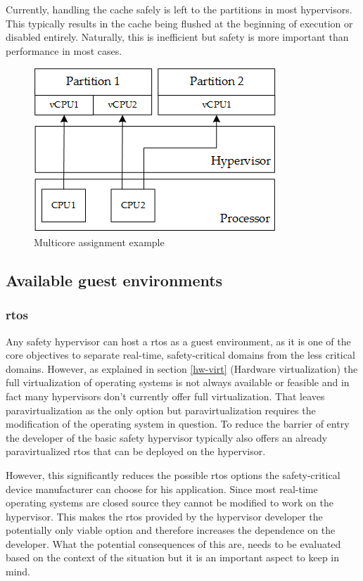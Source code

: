 Currently, handling the cache safely is left to the partitions in most hypervisors. This typically results in the cache being flushed at the beginning of execution or disabled entirely. Naturally, this is inefficient but safety is more important than performance in most cases.

\begin{figure}[hb!]
\centering
\includegraphics[scale=0.75]{Figures/multicore.png}
\decoRule
\caption{Multicore assignment example}
\label{fig:multicore}
\end{figure}

\subsection{Available guest environments}
\subsubsection{\acrshort{rtos}}
Any safety hypervisor can host a \acrlong{rtos} as a guest environment, as it is one of the core objectives to separate real-time, safety-critical domains from the less critical domains. However, as explained in section \ref{hw-virt} (Hardware virtualization) the full virtualization of operating systems is not always available or feasible and in fact many hypervisors don't currently offer full virtualization. That leaves paravirtualization as the only option but paravirtualization requires the modification of the operating system in question. To reduce the barrier of entry the developer of the basic safety hypervisor typically also offers an already paravirtualized \acrshort{rtos} that can be deployed on the hypervisor. 

However, this significantly reduces the possible \acrshort{rtos} options the safety-critical device manufacturer can choose for his application. Since most real-time operating systems are closed source they cannot be modified to work on the hypervisor. This makes the \acrshort{rtos} provided by the hypervisor developer the potentially only viable option and therefore increases the dependence on the developer. What the potential consequences of this are, needs to be evaluated based on the context of the situation but it is an important aspect to keep in mind.

